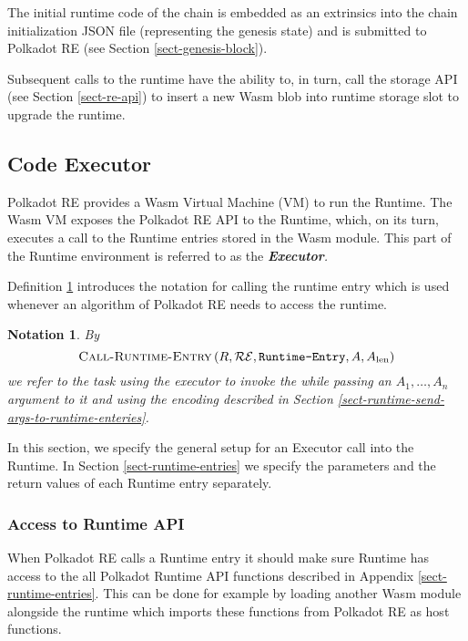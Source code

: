 \documentclass{book}
\newcommand{\tmem}[1]{{\em #1\/}}
\newcommand{\tmname}[1]{\textsc{#1}}
\newcommand{\tmop}[1]{\ensuremath{\operatorname{#1}}}
\newcommand{\tmstrong}[1]{\textbf{#1}}
\newcommand{\tmtextbf}[1]{{\bfseries{#1}}}
\newcommand{\tmtextit}[1]{{\itshape{#1}}}
\newcommand{\tmtextsc}[1]{{\scshape{#1}}}
\newcommand{\tmtexttt}[1]{{\ttfamily{#1}}}
\newcommand{\tmverbatim}[1]{{\ttfamily{#1}}}
\newtheorem{notation}{Notation}
\providecommand{\tmem}[1]{\tmtextit{#1}}
\providecommand{\tmname}[1]{\tmtextsc{#1}}
\providecommand{\tmop}[1]{\ensuremath{\mathrm{#1}}}
\providecommand{\tmstrong}[1]{\tmtextbf{#1}}
\providecommand{\tmtextbf}[1]{\tmtextbf{#1}}
\providecommand{\tmtextit}[1]{\tmtextit{#1}}
\providecommand{\tmverbatim}[1]{\tmtexttt{#1}}
\newtheorem{notation}{Notation}
\begin{document}
The initial runtime code of the chain is embedded as an extrinsics into the
chain initialization JSON file (representing the genesis state) and is
submitted to Polkadot RE (see Section \ref{sect-genesis-block}).

Subsequent calls to the runtime have the ability to, in turn, call the storage
API (see Section \ref{sect-re-api}) to insert a new Wasm blob into runtime
storage slot to upgrade the runtime.

\subsection{Code Executor}

Polkadot RE provides a Wasm Virtual Machine (VM) to run the Runtime. The Wasm
VM exposes the Polkadot RE API to the Runtime, which, on its turn, executes a
call to the Runtime entries stored in the Wasm module. This part of the
Runtime environment is referred to as the {\tmem{{\tmstrong{Executor}}.}}

Definition \ref{nota-call-into-runtime} introduces the notation for calling
the runtime entry which is used whenever an algorithm of Polkadot RE needs to
access the runtime.

\begin{notation}
  \label{nota-call-into-runtime} By
  \[ \text{{\tmname{Call-Runtime-Entry}}} \left( R, \mathcal{R}\mathcal{E},
     \text{\tmverbatim{Runtime-Entry}}, A, A_{\tmop{len}} \right) \]
  we refer to the task using the executor to invoke the
  \tmverbatim{Runtime-Entry} while passing an $A_1, \ldots, A_n$ argument to
  it and using the encoding described in Section
  \ref{sect-runtime-send-args-to-runtime-enteries}.
\end{notation}

In this section, we specify the general setup for an Executor call into the
Runtime. In Section \ref{sect-runtime-entries} we specify the parameters and
the return values of each Runtime entry separately.

\subsubsection{Access to Runtime API}

When Polkadot RE calls a Runtime entry it should make sure Runtime has access
to the all Polkadot Runtime API functions described in Appendix
\ref{sect-runtime-entries}. This can be done for example by loading another
Wasm module alongside the runtime which imports these functions from Polkadot
RE as host functions.
\end{document}
